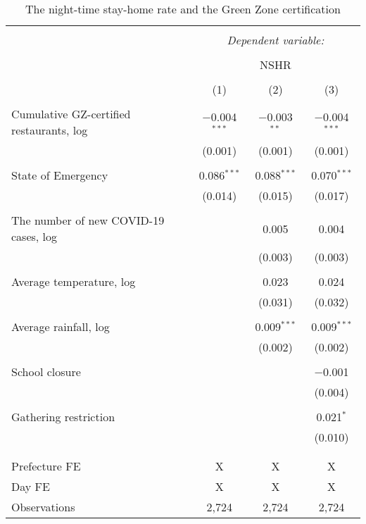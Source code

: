 
\begin{table}[!htbp] \centering 
  \caption{The night-time stay-home rate and the Green Zone certification} 
  \label{} 
\footnotesize 
\begin{tabular}{@{\extracolsep{1pt}}lccc} 
\\[-1.8ex]\hline 
\hline \\[-1.8ex] 
 & \multicolumn{3}{c}{\textit{Dependent variable:}} \\ 
\cline{2-4} 
\\[-1.8ex] & \multicolumn{3}{c}{NSHR} \\ 
\\[-1.8ex] & (1) & (2) & (3)\\ 
\hline \\[-1.8ex] 
 Cumulative GZ-certified restaurants, log & $-$0.004$^{***}$ & $-$0.003$^{**}$ & $-$0.004$^{***}$ \\ 
  & (0.001) & (0.001) & (0.001) \\ 
  & & & \\ 
 State of Emergency & 0.086$^{***}$ & 0.088$^{***}$ & 0.070$^{***}$ \\ 
  & (0.014) & (0.015) & (0.017) \\ 
  & & & \\ 
 The number of new COVID-19 cases, log &  & 0.005 & 0.004 \\ 
  &  & (0.003) & (0.003) \\ 
  & & & \\ 
 Average temperature, log &  & 0.023 & 0.024 \\ 
  &  & (0.031) & (0.032) \\ 
  & & & \\ 
 Average rainfall, log &  & 0.009$^{***}$ & 0.009$^{***}$ \\ 
  &  & (0.002) & (0.002) \\ 
  & & & \\ 
 School closure &  &  & $-$0.001 \\ 
  &  &  & (0.004) \\ 
  & & & \\ 
 Gathering restriction &  &  & 0.021$^{*}$ \\ 
  &  &  & (0.010) \\ 
  & & & \\ 
\hline \\[-1.8ex] 
Prefecture FE & X & X & X \\ 
Day FE & X & X & X \\ 
Observations & 2,724 & 2,724 & 2,724 \\ 

\end{tabular}
\end{table}

